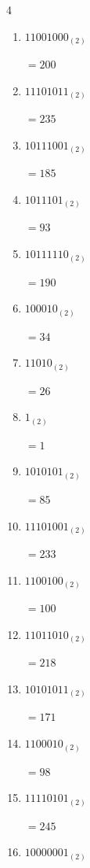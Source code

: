 \begin{multicols}{4}
\begin{enumerate}
        $=232$

  \item $11001000_{(2)}$

        $=200$

  \item $11101011_{(2)}$

        $=235$

  \item $10111001_{(2)}$

        $=185$

\columnbreak %

  \item $1011101_{(2)}$

        $=93$

  \item $10111110_{(2)}$

        $=190$

  \item $100010_{(2)}$

        $=34$

  \item $11010_{(2)}$

        $=26$

  \item $1_{(2)}$

        $=1$

  \item $1010101_{(2)}$

        $=85$

  \item $11101001_{(2)}$

        $=233$

  \item $1100100_{(2)}$

        $=100$

  \item $11011010_{(2)}$

        $=218$

  \item $10101011_{(2)}$

        $=171$

  \item $1100010_{(2)}$

        $=98$

  \item $11110101_{(2)}$

        $=245$

  \item $10000001_{(2)}$


\end{enumerate}
\end{multicols}

